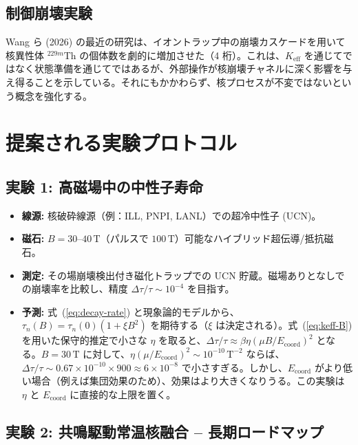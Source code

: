 \documentclass[12pt]{article}
\newcommand{\Keff}{K_{\mathrm{eff}}}
\theoremstyle{remark}
\begin{document}
	\subsection{制御崩壊実験}
	
	Wang ら (2026) の最近の研究は、イオントラップ中の崩壊カスケードを用いて核異性体 \(^{229m}\)Th の個体数を劇的に増加させた（4 桁）。これは、\(\Keff\) を通じてではなく状態準備を通じてではあるが、外部操作が核崩壊チャネルに深く影響を与え得ることを示している。それにもかかわらず、核プロセスが不変ではないという概念を強化する。
	
	\section{提案される実験プロトコル}
	\label{sec:experiments}
	
	\subsection{実験 1: 高磁場中の中性子寿命}
	
	\begin{itemize}
		\item \textbf{線源:} 核破砕線源（例：ILL, PNPI, LANL）での超冷中性子 (UCN)。
		\item \textbf{磁石:} \(B = 30\)–\(40\,\text{T}\)（パルスで \(100\,\text{T}\)）可能なハイブリッド超伝導/抵抗磁石。
		\item \textbf{測定:} その場崩壊検出付き磁化トラップでの UCN 貯蔵。磁場ありとなしでの崩壊率を比較し、精度 \(\Delta \tau / \tau \sim 10^{-4}\) を目指す。
		\item \textbf{予測:} 式~(\ref{eq:decay-rate}) と現象論的モデルから、\(\tau_n(B) = \tau_n(0) (1 + \xi B^2)\) を期待する（\(\xi\) は決定される）。式~(\ref{eq:keff-B}) を用いた保守的推定で小さな \(\eta\) を取ると、\(\Delta \tau/\tau \approx \beta \eta (\mu B/E_{\mathrm{coord}})^2\) となる。\(B = 30\,\text{T}\) に対して、\(\eta (\mu/E_{\mathrm{coord}})^2 \sim 10^{-10}\,\text{T}^{-2}\) ならば、\(\Delta \tau/\tau \sim 0.67 \times 10^{-10} \times 900 \approx 6\times10^{-8}\) で小さすぎる。しかし、\(E_{\mathrm{coord}}\) がより低い場合（例えば集団効果のため）、効果はより大きくなりうる。この実験は \(\eta\) と \(E_{\mathrm{coord}}\) に直接的な上限を置く。
	\end{itemize}
	
	\subsection{実験 2: 共鳴駆動常温核融合 – 長期ロードマップ}
	
\end{document}
